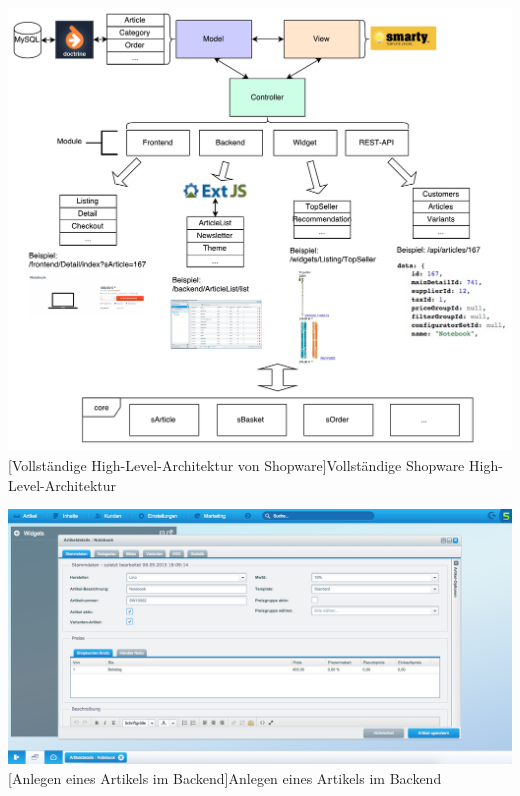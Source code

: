 \begin{appendix}
\vspace{1em}
\begin{minipage}{\linewidth}
	\centering
	\includegraphics[width=1\linewidth]{Abbildungen/shopwareMVC.pdf}
	[Vollständige High-Level-Architektur von Shopware]{Vollständige Shopware High-Level-Architektur}
	\label{fig:shopwareMVCLong}
\end{minipage}
\vspace{1em}

\vspace{1em}
\begin{minipage}{\linewidth}
	\centering
	\includegraphics[width=1\linewidth]{Abbildungen/shopwareBackendArtikel.png}
	[Anlegen eines Artikels im Backend]{Anlegen eines Artikels im Backend}
	\label{app:shopwareBackendArtikel}
\end{minipage}
\vspace{1em}


\end{appendix}
